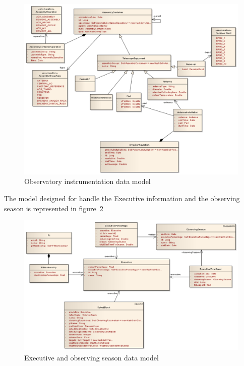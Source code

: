 \begin{figure}[]	
\begin{center}
\includegraphics[width=\textwidth]{images/Observatory}
\caption{Observatory instrumentation data model}
\end{center}
\label{fig:datamodel-observatory}
\end{figure}

The model designed for handle the Executive information and the observing season is represented in figure~\ref{fig:datamodel-executive}

\begin{figure}[]	
\begin{center}
\includegraphics[width=\textwidth]{images/Executive}
\caption{Executive and observing season data model}
\end{center}
\label{fig:datamodel-executive}
\end{figure}


